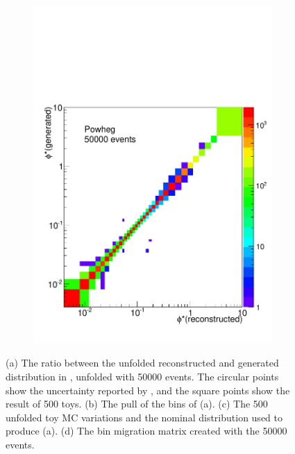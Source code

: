 \begin{figure}[!htbp]
\begin{subfigure}[b]{\SideBySidePlotWidth}
        \includegraphics[width=\textwidth]{figures/BinM_P_50000.pdf}
        \caption{}
        \label{fig:bin_migration_50000}
    \end{subfigure}
    \caption[
        Full uncertainty propegation using \num{50000} \POWHEG events to unfold
        \MADGRAPH.
    ]{
        (a) The ratio between the unfolded reconstructed and generated
        \phistar distribution in \MADGRAPH, unfolded with \num{50000} \POWHEG
        events. The circular points show the uncertainty reported by
        \RooUnfold, and the square points show the result of \num{500} toys.
        (b) The pull of the bins of (a). (c) The \num{500} unfolded toy MC
        variations and the nominal distribution used to produce (a). (d) The
        bin migration matrix created with the \num{50000} \POWHEG events.
    }
\label{fig:50000_propegation_unfolding}
\end{figure}

